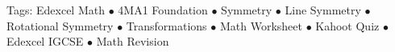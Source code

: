 \documentclass[11pt,a4paper]{article}
\begin{document}
\vspace{14pt}
\begin{center}
  \sffamily\scriptsize\textcolor{textmuted}{
    Tags: Edexcel Math $\bullet$ 4MA1 Foundation $\bullet$ Symmetry $\bullet$ Line Symmetry $\bullet$ Rotational Symmetry $\bullet$ Transformations $\bullet$ Math Worksheet $\bullet$ Kahoot Quiz $\bullet$ Edexcel IGCSE $\bullet$ Math Revision
  }
\end{center}
\end{document}
